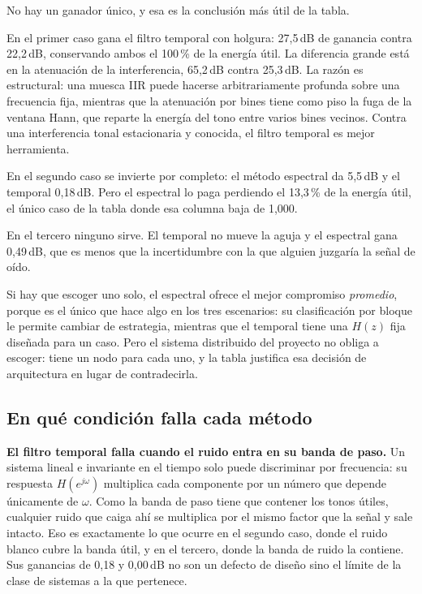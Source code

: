 No hay un ganador único, y esa es la conclusión más útil de la tabla.

En el primer caso gana el filtro temporal con holgura: 27,5\,dB de ganancia
contra 22,2\,dB, conservando ambos el 100\,\% de la energía útil. La diferencia
grande está en la atenuación de la interferencia, 65,2\,dB contra 25,3\,dB. La
razón es estructural: una muesca IIR puede hacerse arbitrariamente profunda sobre
una frecuencia fija, mientras que la atenuación por bines tiene como piso la fuga
de la ventana Hann, que reparte la energía del tono entre varios bines vecinos.
Contra una interferencia tonal estacionaria y conocida, el filtro temporal es
mejor herramienta.

En el segundo caso se invierte por completo: el método espectral da 5,5\,dB y el
temporal 0,18\,dB. Pero el espectral lo paga perdiendo el 13,3\,\% de la energía
útil, el único caso de la tabla donde esa columna baja de 1,000.

En el tercero ninguno sirve. El temporal no mueve la aguja y el espectral gana
0,49\,dB, que es menos que la incertidumbre con la que alguien juzgaría la señal
de oído.

Si hay que escoger uno solo, el espectral ofrece el mejor compromiso
\emph{promedio}, porque es el único que hace algo en los tres escenarios: su
clasificación por bloque le permite cambiar de estrategia, mientras que el
temporal tiene una $H(z)$ fija diseñada para un caso. Pero el sistema distribuido
del proyecto no obliga a escoger: tiene un nodo para cada uno, y la tabla
justifica esa decisión de arquitectura en lugar de contradecirla.

\subsection{En qué condición falla cada método}

\textbf{El filtro temporal falla cuando el ruido entra en su banda de paso.} Un
sistema lineal e invariante en el tiempo solo puede discriminar por frecuencia:
su respuesta $H(e^{j\omega})$ multiplica cada componente por un número que
depende únicamente de $\omega$. Como la banda de paso tiene que contener los
tonos útiles, cualquier ruido que caiga ahí se multiplica por el mismo factor que
la señal y sale intacto. Eso es exactamente lo que ocurre en el segundo caso,
donde el ruido blanco cubre la banda útil, y en el tercero, donde la banda de
ruido la contiene. Sus ganancias de 0,18 y 0,00\,dB no son un defecto de diseño
sino el límite de la clase de sistemas a la que pertenece.

